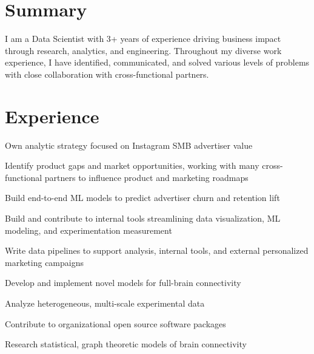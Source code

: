 \documentclass[]{deedy-resume-openfont}
\begin{document}
\hfill
\begin{minipage}[t]{0.63\textwidth}

\section{Summary}
I am a Data Scientist with 3+ years of experience driving business impact through
research, analytics, and engineering. Throughout my diverse work experience, I have identified,
communicated, and solved various levels of problems with close collaboration with
cross-functional partners.
\sectionsep




\section{Experience}
\vspace{\topsep}
\begin{tightemize}
\item {Own analytic strategy focused on Instagram SMB advertiser value}
\item {Identify product gaps and market opportunities, working with many cross-functional
	partners to influence product and marketing roadmaps}
\item {Build end-to-end ML models to predict advertiser churn and retention lift}
\item {Build and contribute to internal tools streamlining data visualization, ML modeling, and experimentation measurement}
\item {Write data pipelines to support analysis, internal tools, and external personalized marketing campaigns}
\end{tightemize}
\sectionsep

\vspace{\topsep}
\begin{tightemize}
\item {Develop and implement novel models for full-brain connectivity}
\item {Analyze heterogeneous, multi-scale experimental data}
\item {Contribute to organizational open source software packages}
\item {Research statistical, graph theoretic models of brain connectivity}
\end{tightemize}
\sectionsep


\end{minipage}
\end{document}

